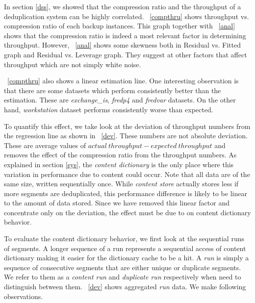 In section \ref{dss}, we showed that the compression ratio and the throughput of a deduplication system can be highly correlated. \figurename~\ref{compthru} shows throughput vs. compression ratio of each backup instances. This graph together with \figurename~\ref{anal} shows that the compression ratio is indeed a most relevant factor in determining throughput. However, \figurename~\ref{anal} shows some skewness both in Residual vs. Fitted graph and Residual vs. Leverage graph. They suggest at other factors that affect throughput which are not simply white noise. 

\figurename~\ref{compthru} also shows a linear estimation line. One interesting observation is that there are some datasets which perform consistently better than the estimation. These are \emph{exchange\_is}, \emph{fredp4} and \emph{fredvar} datasets. On the other hand, \emph{workstation} dataset performs consistently worse than expected. 

To quantify this effect, we take look at the deviation of throughput numbers from the regression line as shown in \tablename~\ref{dev}. These numbers are not absolute deviation. These are average values of $actual\ throughput - expected\ throughput$ and removes the effect of the compression ratio from the throughput numbers. As explained in section \ref{sys}, the \emph{content dictionary} is the only place where this variation in performance due to content could occur. Note that all data are of the same size, written sequentially once. While \emph{content store} actually stores less if more segments are deduplicated, this performance difference is likely to be linear to the amount of data stored. Since we have removed this linear factor and concentrate only on the deviation, the effect must be due to on content dictionary behavior.

To evaluate the content dictionary behavior, we first look at the sequential runs of segments. A longer sequence of a run represents a sequential access of content dictionary making it easier for the dictionary cache to be a hit. A \emph{run} is simply a sequence of consecutive segments that are either unique or duplicate segments. We refer to them as a \emph{content run} and \emph{duplicate run} respectively when need to distinguish between them. \tablename~\ref{dev} shows aggregated \emph{run} data. We make following observations.

